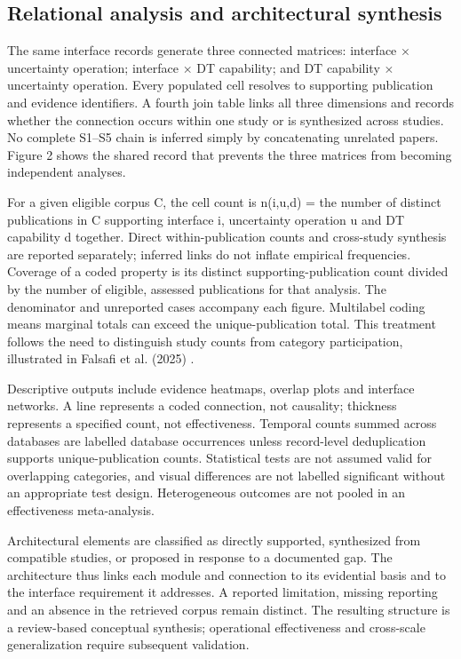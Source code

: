 \subsection{Relational analysis and architectural synthesis}

The same interface records generate three connected matrices: interface $\times$ uncertainty operation; interface $\times$ DT capability; and DT capability $\times$ uncertainty operation. Every populated cell resolves to supporting publication and evidence identifiers. A fourth join table links all three dimensions and records whether the connection occurs within one study or is synthesized across studies. No complete S1--S5 chain is inferred simply by concatenating unrelated papers. Figure 2 shows the shared record that prevents the three matrices from becoming independent analyses.

For a given eligible corpus C, the cell count is n(i,u,d) = the number of distinct publications in C supporting interface i, uncertainty operation u and DT capability d together. Direct within-publication counts and cross-study synthesis are reported separately; inferred links do not inflate empirical frequencies. Coverage of a coded property is its distinct supporting-publication count divided by the number of eligible, assessed publications for that analysis. The denominator and unreported cases accompany each figure. Multilabel coding means marginal totals can exceed the unique-publication total. This treatment follows the need to distinguish study counts from category participation, illustrated in Falsafi et al. (2025) \citep{M03}.

Descriptive outputs include evidence heatmaps, overlap plots and interface networks. A line represents a coded connection, not causality; thickness represents a specified count, not effectiveness. Temporal counts summed across databases are labelled database occurrences unless record-level deduplication supports unique-publication counts. Statistical tests are not assumed valid for overlapping categories, and visual differences are not labelled significant without an appropriate test design. Heterogeneous outcomes are not pooled in an effectiveness meta-analysis.

Architectural elements are classified as directly supported, synthesized from compatible studies, or proposed in response to a documented gap. The architecture thus links each module and connection to its evidential basis and to the interface requirement it addresses. A reported limitation, missing reporting and an absence in the retrieved corpus remain distinct. The resulting structure is a review-based conceptual synthesis; operational effectiveness and cross-scale generalization require subsequent validation.

